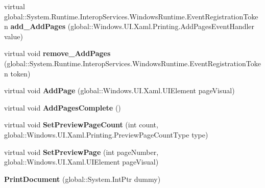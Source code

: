 \begin{DoxyCompactItemize}
virtual global\+::\+System.\+Runtime.\+Interop\+Services.\+Windows\+Runtime.\+Event\+Registration\+Token {\bfseries add\+\_\+\+Add\+Pages} (global\+::\+Windows.\+U\+I.\+Xaml.\+Printing.\+Add\+Pages\+Event\+Handler value)
\item 
\mbox{\label{class_windows_1_1_u_i_1_1_xaml_1_1_printing_1_1_print_document_ac0b62cd4a9c0d95589b9afcb1f7a0082}} 
virtual void {\bfseries remove\+\_\+\+Add\+Pages} (global\+::\+System.\+Runtime.\+Interop\+Services.\+Windows\+Runtime.\+Event\+Registration\+Token token)
\item 
\mbox{\label{class_windows_1_1_u_i_1_1_xaml_1_1_printing_1_1_print_document_ab73e0795893f75e4c311206a05f5604e}} 
virtual void {\bfseries Add\+Page} (global\+::\+Windows.\+U\+I.\+Xaml.\+U\+I\+Element page\+Visual)
\item 
\mbox{\label{class_windows_1_1_u_i_1_1_xaml_1_1_printing_1_1_print_document_a86b1ab90c519769c55161873f7402602}} 
virtual void {\bfseries Add\+Pages\+Complete} ()
\item 
\mbox{\label{class_windows_1_1_u_i_1_1_xaml_1_1_printing_1_1_print_document_acdb1e1f03c6ad6617b2045feee076bb1}} 
virtual void {\bfseries Set\+Preview\+Page\+Count} (int count, global\+::\+Windows.\+U\+I.\+Xaml.\+Printing.\+Preview\+Page\+Count\+Type type)
\item 
\mbox{\label{class_windows_1_1_u_i_1_1_xaml_1_1_printing_1_1_print_document_a9b89dc73b3d3108f6a9a5bbda7805863}} 
virtual void {\bfseries Set\+Preview\+Page} (int page\+Number, global\+::\+Windows.\+U\+I.\+Xaml.\+U\+I\+Element page\+Visual)
\item 
\mbox{\label{class_windows_1_1_u_i_1_1_xaml_1_1_printing_1_1_print_document_ac0c6ca7b864f685e2f0989f778c41e72}} 
{\bfseries Print\+Document} (global\+::\+System.\+Int\+Ptr dummy)
\item 
\mbox{\label{class_windows_1_1_u_i_1_1_xaml_1_1_printing_1_1_print_document_a58bc53aad6d052d4b2a25935ba3f7844}} 

\end{DoxyCompactItemize}
